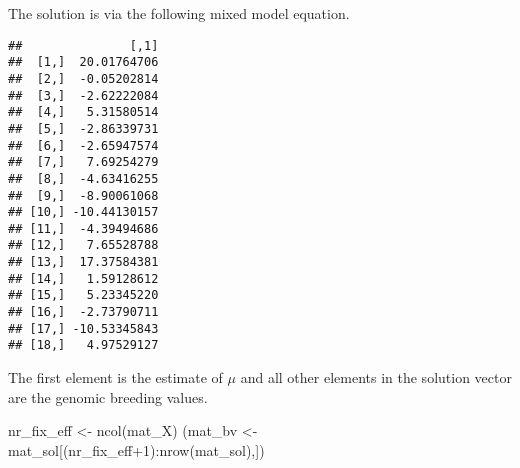 \documentclass[
]{article}
\newenvironment{Shaded}{\begin{snugshade}}{\end{snugshade}}
\newcommand{\AttributeTok}[1]{\textcolor[rgb]{0.77,0.63,0.00}{#1}}
\newcommand{\DecValTok}[1]{\textcolor[rgb]{0.00,0.00,0.81}{#1}}
\newcommand{\FunctionTok}[1]{\textcolor[rgb]{0.00,0.00,0.00}{#1}}
\newcommand{\NormalTok}[1]{#1}
\newcommand{\OtherTok}[1]{\textcolor[rgb]{0.56,0.35,0.01}{#1}}
\newcommand{\SpecialCharTok}[1]{\textcolor[rgb]{0.00,0.00,0.00}{#1}}
\begin{document}
The solution is via the following mixed model equation.

\begin{Shaded}
\end{Shaded}

\begin{verbatim}
##               [,1]
##  [1,]  20.01764706
##  [2,]  -0.05202814
##  [3,]  -2.62222084
##  [4,]   5.31580514
##  [5,]  -2.86339731
##  [6,]  -2.65947574
##  [7,]   7.69254279
##  [8,]  -4.63416255
##  [9,]  -8.90061068
## [10,] -10.44130157
## [11,]  -4.39494686
## [12,]   7.65528788
## [13,]  17.37584381
## [14,]   1.59128612
## [15,]   5.23345220
## [16,]  -2.73790711
## [17,] -10.53345843
## [18,]   4.97529127
\end{verbatim}

The first element is the estimate of \(\mu\) and all other elements in
the solution vector are the genomic breeding values.

\begin{Shaded}
\begin{Highlighting}[]
\NormalTok{nr\_fix\_eff }\OtherTok{\textless{}{-}} \FunctionTok{ncol}\NormalTok{(mat\_X)}
\NormalTok{(mat\_bv }\OtherTok{\textless{}{-}}\NormalTok{ mat\_sol[(nr\_fix\_eff}\SpecialCharTok{+}\DecValTok{1}\NormalTok{)}\SpecialCharTok{:}\FunctionTok{nrow}\NormalTok{(mat\_sol),])}
\end{Highlighting}
\end{Shaded}
\end{document}
